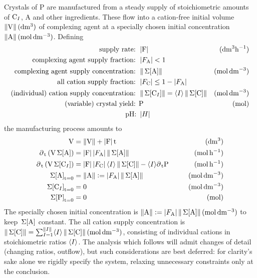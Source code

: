 \documentclass[a4paper]{base}
\newcommand{\pt}{\partial_{\,\dn{t}}}
\newcommand{\stc}[1]{\M{\langle #1 \rangle}}
\begin{document}
    Crystals of P are manufactured from a steady supply of stoichiometric amounts of $\dn[I]{C}$, A and other ingredients. These flow into a cation-free initial volume $\dn{\norm{V} (dm^{3})}$ of complexing agent at a specially chosen initial concentration $\norm{\dn{A}} (\dn{mol\, dm^{-3}})$. Defining
    \begin{equation} \label{def:intro:Supply}
        \begin{aligned}
            \T{supply rate: } &\mds{\dn{F}}\ &(\dn{dm^{3}h^{-1}}) \\
            \T{complexing agent supply fraction: } & \mds{F_{\dn{A}}} < 1 \\
            \T{complexing agent supply concentration: } & \norm{\tot{\cn{A}}}\  &(\dn{mol\, dm^{-3}}) \\
            \T{all cation supply fraction: } & \mds{F_{\dn{C}}} \leq 1 - \mds{F_{\dn{A}}}\\
            \T{(individual) cation supply concentration: } & \norm{\tot{\cn{C_{\mathnormal{I}}}}} = \stc{I} \norm{\tot{\cn{C}}} &(\dn{mol\, dm^{-3}})\\
            \T{(variable) crystal yield: } & \dn{P} &\un{mol}\\
            \T{pH: } & \mds{H}
        \end{aligned}
    \end{equation}
    the manufacturing process amounts to
    \begin{equation} \label{eq:intro:Supply}
        \begin{aligned}
            \dn{V} &= \dn{\norm{V} + \mds{F} t} \qquad &\un{dm^{3}} \\
            \pt \left(\dn{V} \tot{\cn{A}}\right) &= \mds{\dn{F}} \mds{F_{\dn{A}}} \norm{\tot{\cn{A}}} \qquad &\un{mol\,h^{-1}}\\
            \pt \left(\dn{V} \tot{\cn{C_{\mathnormal{I}}}}\right) &= \mds{\dn{F}} \mds{F_{\dn{C}}} \stc{I} \norm{\tot{\cn{C}}} - \stc{I} \pt \dn{P}  \qquad &\un{mol\,h^{-1}}\\
            \dn{\tot{\cn{A}}_{t=0}} &= \norm{\dn{A}} \deq \mds{F_{\dn{A}}} \norm{\tot{\cn{A}}} \qquad &\un{mol\,dm^{-3}}\\
            \tot{\cn[I]{C}}_{\dn{t=0}} &= 0 \qquad &\un{mol\,dm^{-3}}\\
            \dn{\tot{\cn{P}}_{t=0}} &= 0 \qquad &\un{mol}
        \end{aligned}
    \end{equation}
    The specially chosen initial concentration is $\norm{\dn{A}} \deq \mds{F_{\dn{A}}} \norm{\tot{\cn{A}}}\un{mol\,dm^{-3}}$ to keep $\tot{\cn{A}}$ constant.
    The all cation supply concentration is $\norm{\tot{\cn{C}}} = \sum_{I=1}^{\norm{I}} \stc{I} \norm{\tot{\cn{C}}}\un{mol\,dm^{-3}}$, consisting of individual cations in stoichiometric ratios $\stc{I}$.
    The analysis which follows will admit changes of detail (changing ratios, outflow), but such considerations are best deferred: for clarity's sake alone we rigidly specify the system, relaxing unnecessary constraints only at the conclusion.
\end{document}
